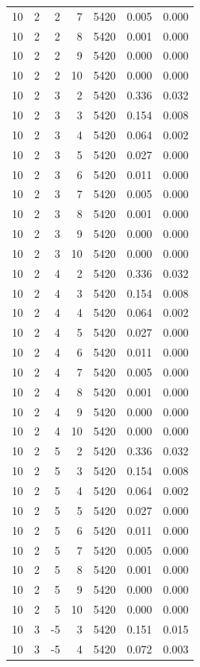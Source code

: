 \begin{table}
\begin{tabular}{rrrrrrr}
10 & 2 & 2 & 7 & 5420 & 0.005 & 0.000 \\
10 & 2 & 2 & 8 & 5420 & 0.001 & 0.000 \\
10 & 2 & 2 & 9 & 5420 & 0.000 & 0.000 \\
10 & 2 & 2 & 10 & 5420 & 0.000 & 0.000 \\
10 & 2 & 3 & 2 & 5420 & 0.336 & 0.032 \\
10 & 2 & 3 & 3 & 5420 & 0.154 & 0.008 \\
10 & 2 & 3 & 4 & 5420 & 0.064 & 0.002 \\
10 & 2 & 3 & 5 & 5420 & 0.027 & 0.000 \\
10 & 2 & 3 & 6 & 5420 & 0.011 & 0.000 \\
10 & 2 & 3 & 7 & 5420 & 0.005 & 0.000 \\
10 & 2 & 3 & 8 & 5420 & 0.001 & 0.000 \\
10 & 2 & 3 & 9 & 5420 & 0.000 & 0.000 \\
10 & 2 & 3 & 10 & 5420 & 0.000 & 0.000 \\
10 & 2 & 4 & 2 & 5420 & 0.336 & 0.032 \\
10 & 2 & 4 & 3 & 5420 & 0.154 & 0.008 \\
10 & 2 & 4 & 4 & 5420 & 0.064 & 0.002 \\
10 & 2 & 4 & 5 & 5420 & 0.027 & 0.000 \\
10 & 2 & 4 & 6 & 5420 & 0.011 & 0.000 \\
10 & 2 & 4 & 7 & 5420 & 0.005 & 0.000 \\
10 & 2 & 4 & 8 & 5420 & 0.001 & 0.000 \\
10 & 2 & 4 & 9 & 5420 & 0.000 & 0.000 \\
10 & 2 & 4 & 10 & 5420 & 0.000 & 0.000 \\
10 & 2 & 5 & 2 & 5420 & 0.336 & 0.032 \\
10 & 2 & 5 & 3 & 5420 & 0.154 & 0.008 \\
10 & 2 & 5 & 4 & 5420 & 0.064 & 0.002 \\
10 & 2 & 5 & 5 & 5420 & 0.027 & 0.000 \\
10 & 2 & 5 & 6 & 5420 & 0.011 & 0.000 \\
10 & 2 & 5 & 7 & 5420 & 0.005 & 0.000 \\
10 & 2 & 5 & 8 & 5420 & 0.001 & 0.000 \\
10 & 2 & 5 & 9 & 5420 & 0.000 & 0.000 \\
10 & 2 & 5 & 10 & 5420 & 0.000 & 0.000 \\
10 & 3 & -5 & 3 & 5420 & 0.151 & 0.015 \\
10 & 3 & -5 & 4 & 5420 & 0.072 & 0.003 \\

\end{tabular}
\end{table}
